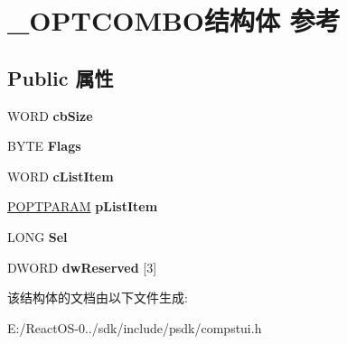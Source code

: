 \hypertarget{struct___o_p_t_c_o_m_b_o}{}\section{\+\_\+\+O\+P\+T\+C\+O\+M\+B\+O结构体 参考}
\label{struct___o_p_t_c_o_m_b_o}
\subsection*{Public 属性}
\begin{DoxyCompactItemize}
\item 
\mbox{\label{struct___o_p_t_c_o_m_b_o_a7807865f836aa26ffe586757f51fa167}} 
W\+O\+RD {\bfseries cb\+Size}
\item 
\mbox{\label{struct___o_p_t_c_o_m_b_o_a9894c2a8b69a1b633c62ed109bfd1d93}} 
B\+Y\+TE {\bfseries Flags}
\item 
\mbox{\label{struct___o_p_t_c_o_m_b_o_a0064f66ba61e1255934d81160ba6d301}} 
W\+O\+RD {\bfseries c\+List\+Item}
\item 
\mbox{\label{struct___o_p_t_c_o_m_b_o_a44e5639247936724c23a53f31aed9da0}} 
\hyperlink{struct___o_p_t_p_a_r_a_m}{P\+O\+P\+T\+P\+A\+R\+AM} {\bfseries p\+List\+Item}
\item 
\mbox{\label{struct___o_p_t_c_o_m_b_o_a47db1dfbc219e3859a5c4dd250206ef5}} 
L\+O\+NG {\bfseries Sel}
\item 
\mbox{\label{struct___o_p_t_c_o_m_b_o_abc34b823e1a0741e4c58f560db474390}} 
D\+W\+O\+RD {\bfseries dw\+Reserved} \mbox{[}3\mbox{]}
\end{DoxyCompactItemize}


该结构体的文档由以下文件生成\+:\begin{DoxyCompactItemize}
\item 
E\+:/\+React\+O\+S-\/0../sdk/include/psdk/compstui.\+h\end{DoxyCompactItemize}
